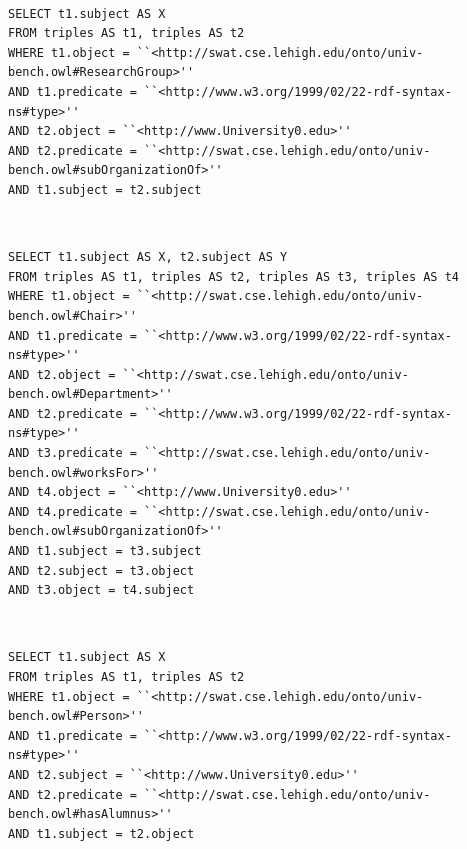 \documentclass[10pt, a4paper]{report}
\begin{document}
\begin{enumerate}
\begin{minipage}{0.92\textwidth}
	\end{minipage} \\
	\begin{minipage}{0.92\textwidth}
		\item \label{query:lumb_sql_11}
		\lstset{language=sql}
		\begin{lstlisting}
SELECT t1.subject AS X
FROM triples AS t1, triples AS t2
WHERE t1.object = ``<http://swat.cse.lehigh.edu/onto/univ-bench.owl#ResearchGroup>''
AND t1.predicate = ``<http://www.w3.org/1999/02/22-rdf-syntax-ns#type>''
AND t2.object = ``<http://www.University0.edu>''
AND t2.predicate = ``<http://swat.cse.lehigh.edu/onto/univ-bench.owl#subOrganizationOf>''
AND t1.subject = t2.subject
                        \end{lstlisting}
	\end{minipage} \\
	\begin{minipage}{0.92\textwidth}
		\item \label{query:lumb_sql_12}
		\lstset{language=sql}
		\begin{lstlisting}
SELECT t1.subject AS X, t2.subject AS Y
FROM triples AS t1, triples AS t2, triples AS t3, triples AS t4
WHERE t1.object = ``<http://swat.cse.lehigh.edu/onto/univ-bench.owl#Chair>''
AND t1.predicate = ``<http://www.w3.org/1999/02/22-rdf-syntax-ns#type>''
AND t2.object = ``<http://swat.cse.lehigh.edu/onto/univ-bench.owl#Department>''
AND t2.predicate = ``<http://www.w3.org/1999/02/22-rdf-syntax-ns#type>''
AND t3.predicate = ``<http://swat.cse.lehigh.edu/onto/univ-bench.owl#worksFor>''
AND t4.object = ``<http://www.University0.edu>''
AND t4.predicate = ``<http://swat.cse.lehigh.edu/onto/univ-bench.owl#subOrganizationOf>''
AND t1.subject = t3.subject
AND t2.subject = t3.object
AND t3.object = t4.subject
                        \end{lstlisting}
	\end{minipage} \\
	\begin{minipage}{0.92\textwidth}
		\item \label{query:lumb_sql_13}
		\lstset{language=sql}
		\begin{lstlisting}
SELECT t1.subject AS X
FROM triples AS t1, triples AS t2
WHERE t1.object = ``<http://swat.cse.lehigh.edu/onto/univ-bench.owl#Person>''
AND t1.predicate = ``<http://www.w3.org/1999/02/22-rdf-syntax-ns#type>''
AND t2.subject = ``<http://www.University0.edu>''
AND t2.predicate = ``<http://swat.cse.lehigh.edu/onto/univ-bench.owl#hasAlumnus>''
AND t1.subject = t2.object

\end{lstlisting}
\end{minipage}
\end{enumerate}
\end{document}
